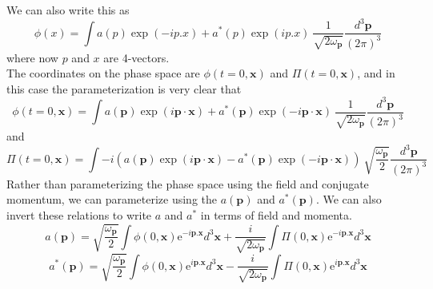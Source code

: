 \documentclass[11pt, notitlepage]{report}
\newcommand{\e}{\mathrm{e}}
\newcommand{\w}{\omega}
\numberwithin{equation}{section}
\begin{document}
    We can also write this as 
    \begin{equation}
        \phi(x) = \int a(p) \exp(-ip.x) + a^*(p) \exp(ip.x) ~\frac{1}{\sqrt{2\w_\textbf{p}}} \frac{d^3 \textbf{p}}{(2\pi)^3} 
    \end{equation}
    where now \(p\) and \(x\) are 4-vectors.\\

    The coordinates on the phase space are \(\phi(t=0, \textbf{x})\) and \(\Pi(t=0, \textbf{x})\), and in this case the parameterization is very clear that 
    \begin{equation}
        \phi(t=0, \textbf{x}) = \int a(\textbf{p}) \exp(i\textbf{p}\cdot \textbf{x}) + a^*(\textbf{p}) \exp(- i\textbf{p}\cdot \textbf{x}) ~ \frac{1}{\sqrt{2\w_\textbf{p}}} \frac{d^3 \textbf{p}}{(2\pi)^3}
    \end{equation}
    and 
    \begin{equation}
        \Pi(t=0, \textbf{x}) = \int -i \left(a(\textbf{p}) \exp(i\textbf{p}\cdot \textbf{x}) - a^*(\textbf{p}) \exp(- i\textbf{p}\cdot \textbf{x}) \right)~ \sqrt{\frac{\w_\textbf{p}}{2}} \frac{d^3 \textbf{p}}{(2\pi)^3}
    \end{equation}
    Rather than parameterizing the phase space using the field and conjugate momentum, we can parameterize using the \(a(\textbf{p})\) and \(a^*(\textbf{p})\). We can also invert these relations to write \(a\) and \(a^*\) in terms of field and momenta.
    \begin{equation}
        a(\textbf{p}) = \sqrt{\frac{\w_\textbf{p}}{2}}\int\phi(0, \textbf{x}) \e^{-i \textbf{p}. \textbf{x}}d^3\textbf{x} + \frac{i}{\sqrt{2\w_\textbf{p}}}\int \Pi(0, \textbf{x})\e^{-i \textbf{p}.\textbf{x}} d^3\textbf{x} 
    \end{equation}
    \begin{equation}
        a^*(\textbf{p}) = \sqrt{\frac{\w_\textbf{p}}{2}}\int\phi(0, \textbf{x}) \e^{i \textbf{p}. \textbf{x}}d^3\textbf{x} - \frac{i}{\sqrt{2\w_\textbf{p}}}\int \Pi(0, \textbf{x})\e^{i \textbf{p}.\textbf{x}} d^3\textbf{x} 
    \end{equation}\\
\end{document}
